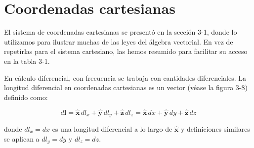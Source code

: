 \section{Coordenadas cartesianas}
El sistema de coordenadas cartesianas se presentó en la sección 3-1, donde lo utilizamos para ilustrar muchas de las leyes del álgebra vectorial. En vez de repetirlas para el sistema cartesiano, las hemos resumido para facilitar su acceso en la tabla 3-1. 

En cálculo diferencial, con frecuencia se trabaja con cantidades diferenciales. La longitud diferencial en coordenadas cartesianas es un vector (véase la figura 3-8) definido como:

\begin{equation}
    d\mathbf{l} = \hat{\mathbf{x}}\,dl_x + \hat{\mathbf{y}}\,dl_y + \hat{\mathbf{z}}\,dl_z = \hat{\mathbf{x}}\,dx + \hat{\mathbf{y}}\,dy + \hat{\mathbf{z}}\,dz
    \label{eq:3.34}
\end{equation}

donde $dl_x = dx$ es una longitud diferencial a lo largo de $\hat{\mathbf{x}}$ y definiciones similares se aplican a $dl_y = dy$ y $dl_z = dz$.

